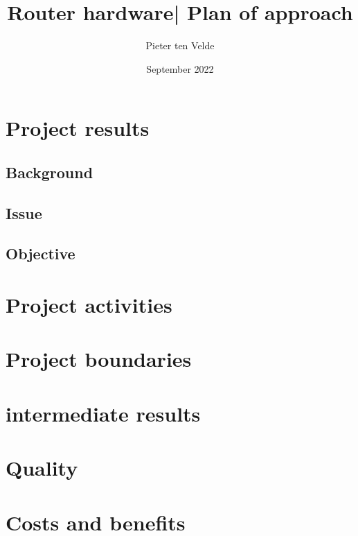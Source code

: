 \documentclass{article}
\title{Router hardware| Plan of approach}
\author{Pieter ten Velde}
\date{September 2022}
\begin{document}
\maketitle
\newpage
\tableofcontents
\newpage

\newpage
\section{Project results}
\subsection{Background}

\subsection{Issue}
\label{subsub:probleemstelling}


\subsection{Objective}


\newpage
\section{Project activities}



\newpage
\section{Project boundaries}


\section{intermediate results}



\newpage
\section{Quality}



\section{Costs and benefits}




\newpage

\begin{landscape}

\end{landscape}
\end{document}
